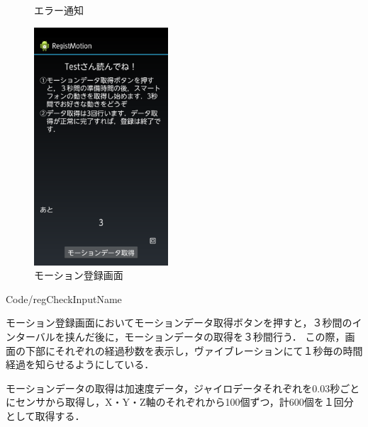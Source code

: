 \documentclass[11pt]{jreport}
\renewcommand{\slash}{/}
\begin{document}
\begin{figure}[htbp]
\begin{minipage}{0.33\hsize}
\begin{center}
                \end{center}
                \caption{エラー通知}
                \label{nameInputError}
            \end{minipage}
            \begin{minipage}{0.33\hsize}
                \begin{center}
                    \includegraphics[width=5cm, bb=0 0 540 960]{Reg.pdf}
                \end{center}
                \caption{モーション登録画面}
                \label{reg}
            \end{minipage}
        \end{figure}

        \newpage

        
        {Code\slash regCheckInputName}
    
        モーション登録画面においてモーションデータ取得ボタンを押すと，３秒間のインターバルを挟んだ後に，モーションデータの取得を３秒間行う．
        この際，画面の下部にそれぞれの経過秒数を表示し，ヴァイブレーションにて１秒毎の時間経過を知らせるようにしている．

        モーションデータの取得は加速度データ，ジャイロデータそれぞれを0.03秒ごとにセンサから取得し，X・Y・Z軸のそれぞれから100個ずつ，計600個を１回分として取得する．
\end{document}
